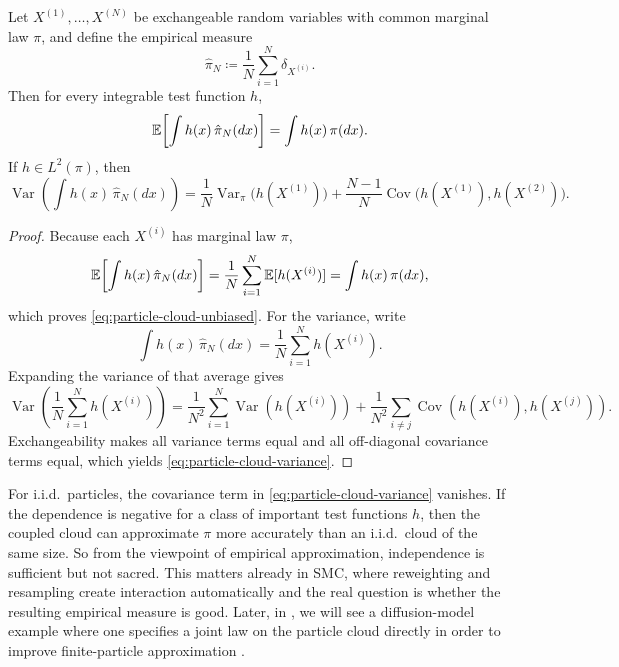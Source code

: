 \begin{proposition}
\label{prop:particle-cloud-unbiased-variance}
Let \(X^{(1)},\dots,X^{(N)}\) be exchangeable random variables with common marginal law \(\pi\), and define the empirical measure
\[
  \hat\pi_N
  \coloneqq
  \frac1N\sum_{i=1}^N \delta_{X^{(i)}}.
\]
Then for every integrable test function \(h\),
\begin{equation}
  \mathbb{E}\!\left[\int h(x)\,\hat\pi_N(dx)\right]
  =
  \int h(x)\,\pi(dx).
  \label{eq:particle-cloud-unbiased}
\end{equation}
If \(h\in L^2(\pi)\), then
\begin{equation}
  \operatorname{Var}\!\left(\int h(x)\,\hat\pi_N(dx)\right)
  =
  \frac{1}{N}\operatorname{Var}_{\pi}\!\bigl(h(X^{(1)})\bigr)
  +
  \frac{N-1}{N}\operatorname{Cov}\!\bigl(h(X^{(1)}),h(X^{(2)})\bigr).
  \label{eq:particle-cloud-variance}
\end{equation}
\end{proposition}
\begin{proof}
Because each \(X^{(i)}\) has marginal law \(\pi\),
\[
  \mathbb{E}\!\left[\int h(x)\,\hat\pi_N(dx)\right]
  =
  \frac1N\sum_{i=1}^N \mathbb{E}[h(X^{(i)})]
  =
  \int h(x)\,\pi(dx),
\]
which proves \eqref{eq:particle-cloud-unbiased}.
For the variance, write
\[
  \int h(x)\,\hat\pi_N(dx)
  =
  \frac1N\sum_{i=1}^N h(X^{(i)}).
\]
Expanding the variance of that average gives
\[
  \operatorname{Var}\!\left(\frac1N\sum_{i=1}^N h(X^{(i)})\right)
  =
  \frac{1}{N^2}\sum_{i=1}^N \operatorname{Var}(h(X^{(i)}))
  +
  \frac{1}{N^2}\sum_{i\neq j}\operatorname{Cov}(h(X^{(i)}),h(X^{(j)})).
\]
Exchangeability makes all variance terms equal and all off-diagonal covariance terms equal, which yields \eqref{eq:particle-cloud-variance}.%
\end{proof}

For i.i.d.\ particles, the covariance term in \eqref{eq:particle-cloud-variance} vanishes.
If the dependence is negative for a class of important test functions \(h\), then the coupled cloud can approximate \(\pi\) more accurately than an i.i.d.\ cloud of the same size.
So from the viewpoint of empirical approximation, independence is sufficient but not sacred.
This matters already in SMC, where reweighting and resampling create interaction automatically and the real question is whether the resulting empirical measure is good.
Later, in , we will see a diffusion-model example where one specifies a joint law on the particle cloud directly in order to improve finite-particle approximation \citep[\S3]{corso_xu_de_bortoli_barzilay_jaakkola_2023_particle_guidance}.

